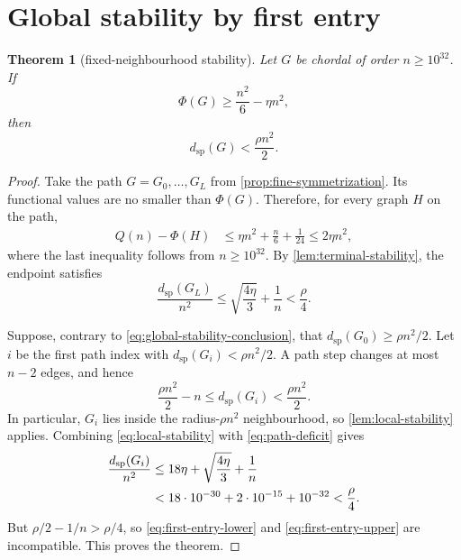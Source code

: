 \documentclass[11pt,reqno]{amsart}
\numberwithin{equation}{section}
\newtheorem{theorem}{Theorem}[section]
\theoremstyle{definition}
\theoremstyle{remark}
\newcommand{\PhiF}{\Phi}
\newcommand{\distsp}{d_{\mathrm{sp}}}
\begin{document}
\section{Global stability by first entry}

\begin{theorem}[fixed-neighbourhood stability]\label{thm:global-stability}
Let $G$ be chordal of order $n\geq10^{32}$.  If
\begin{equation}\label{eq:near-extremal-Phi}
  \PhiF(G)\geq\frac{n^2}{6}-\eta n^2,
\end{equation}
then
\begin{equation}\label{eq:global-stability-conclusion}
  \distsp(G)<\frac{\rho n^2}{2}.
\end{equation}
\end{theorem}

\begin{proof}
Take the path $G=G_0,\ldots,G_L$ from
\cref{prop:fine-symmetrization}.  Its functional values are no smaller than
$\PhiF(G)$.  Therefore, for every graph $H$ on the path,
\begin{align}
  Q(n)-\PhiF(H)
  &\leq \eta n^2+\frac n6+\frac1{24}
   \leq2\eta n^2,
  \label{eq:path-deficit}
\end{align}
where the last inequality follows from $n\geq10^{32}$.
By \cref{lem:terminal-stability}, the endpoint satisfies
\[
  \frac{\distsp(G_L)}{n^2}
  \leq\sqrt{\frac{4\eta}{3}}+\frac1n
  <\frac\rho4.
\]

Suppose, contrary to \eqref{eq:global-stability-conclusion}, that
$\distsp(G_0)\geq\rho n^2/2$.  Let $i$ be the first path index with
$\distsp(G_i)<\rho n^2/2$.  A path step changes at most $n-2$ edges, and hence
\begin{equation}\label{eq:first-entry-lower}
  \frac{\rho n^2}{2}-n
  \leq\distsp(G_i)<\frac{\rho n^2}{2}.
\end{equation}
In particular, $G_i$ lies inside the radius-$\rho n^2$ neighbourhood, so
\cref{lem:local-stability} applies.  Combining
\eqref{eq:local-stability} with \eqref{eq:path-deficit} gives
\begin{align}
  \frac{\distsp(G_i)}{n^2}
  &\leq18\eta+\sqrt{\frac{4\eta}{3}}+\frac1n \notag\\
  &<18\cdot10^{-30}+2\cdot10^{-15}+10^{-32}
   <\frac\rho4.
  \label{eq:first-entry-upper}
\end{align}
But $\rho/2-1/n>\rho/4$, so
\eqref{eq:first-entry-lower} and \eqref{eq:first-entry-upper} are
incompatible.  This proves the theorem.
\end{proof}
\end{document}
